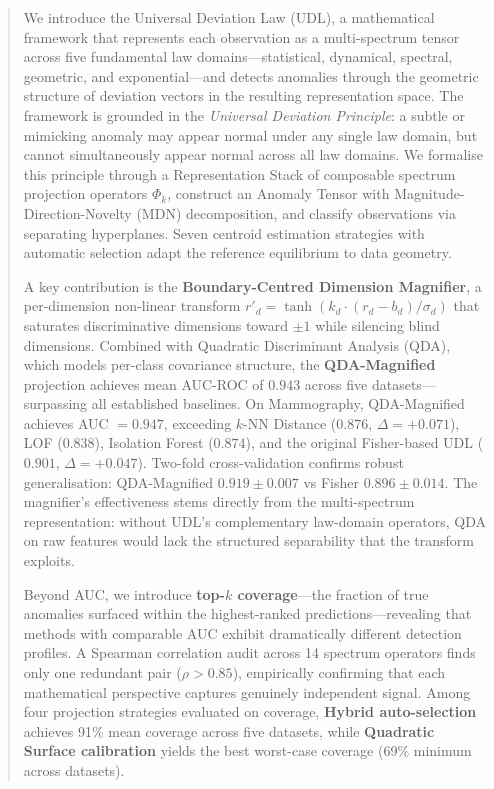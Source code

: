 \documentclass[journal]{IEEEtran}
\begin{document}
\begin{abstract}
We introduce the Universal Deviation Law (UDL), a mathematical framework that represents each observation as a multi-spectrum tensor across five fundamental law domains---statistical, dynamical, spectral, geometric, and exponential---and detects anomalies through the geometric structure of deviation vectors in the resulting representation space. The framework is grounded in the \textit{Universal Deviation Principle}: a subtle or mimicking anomaly may appear normal under any single law domain, but cannot simultaneously appear normal across all law domains. We formalise this principle through a Representation Stack of composable spectrum projection operators $\Phi_k$, construct an Anomaly Tensor with Magnitude-Direction-Novelty (MDN) decomposition, and classify observations via separating hyperplanes. Seven centroid estimation strategies with automatic selection adapt the reference equilibrium to data geometry.

A key contribution is the \textbf{Boundary-Centred Dimension Magnifier}, a per-dimension non-linear transform $r'_d = \tanh(k_d \cdot (r_d - b_d) / \sigma_d)$ that saturates discriminative dimensions toward $\pm 1$ while silencing blind dimensions. Combined with Quadratic Discriminant Analysis (QDA), which models per-class covariance structure, the \textbf{QDA-Magnified} projection achieves mean AUC-ROC of $0.943$ across five datasets---surpassing all established baselines. On Mammography, QDA-Magnified achieves AUC $= 0.947$, exceeding $k$-NN Distance ($0.876$, $\Delta{=}+0.071$), LOF ($0.838$), Isolation Forest ($0.874$), and the original Fisher-based UDL ($0.901$, $\Delta{=}+0.047$). Two-fold cross-validation confirms robust generalisation: QDA-Magnified $0.919 \pm 0.007$ vs Fisher $0.896 \pm 0.014$. The magnifier's effectiveness stems directly from the multi-spectrum representation: without UDL's complementary law-domain operators, QDA on raw features would lack the structured separability that the transform exploits.

Beyond AUC, we introduce \textbf{top-$k$ coverage}---the fraction of true anomalies surfaced within the highest-ranked predictions---revealing that methods with comparable AUC exhibit dramatically different detection profiles. A Spearman correlation audit across 14 spectrum operators finds only one redundant pair ($\rho > 0.85$), empirically confirming that each mathematical perspective captures genuinely independent signal. Among four projection strategies evaluated on coverage, \textbf{Hybrid auto-selection} achieves 91\% mean coverage across five datasets, while \textbf{Quadratic Surface calibration} yields the best worst-case coverage (69\% minimum across datasets).


\end{abstract}
\end{document}
